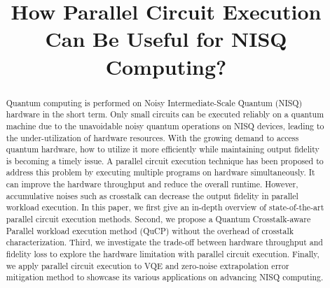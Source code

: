 \documentclass[conference]{IEEEtran}
\begin{document}
\title{How Parallel Circuit Execution Can Be Useful for NISQ Computing?\\

}

\author{
\and
{}
}

\maketitle

\begin{abstract}
Quantum computing is performed on Noisy Intermediate-Scale Quantum (NISQ) hardware in the short term. Only small circuits can be executed reliably on a quantum machine due to the unavoidable noisy quantum operations on NISQ devices, leading to the under-utilization of hardware resources. With the growing demand to access quantum hardware, how to utilize it more efficiently while maintaining output fidelity is becoming a timely issue. A parallel circuit execution technique has been proposed to address this problem by executing multiple programs on hardware simultaneously. It can improve the hardware throughput and reduce the overall runtime. However, accumulative noises such as crosstalk can decrease the output fidelity in parallel workload execution. In this paper, we first give an in-depth overview of state-of-the-art parallel circuit execution methods. Second, we propose a Quantum Crosstalk-aware Parallel workload execution method (QuCP) without the overhead of crosstalk characterization. Third, we investigate the trade-off between hardware throughput and fidelity loss to explore the hardware limitation with parallel circuit execution. Finally, we apply parallel circuit execution to VQE and zero-noise extrapolation error mitigation method to showcase its various applications on advancing NISQ computing.

\end{abstract}
\end{document}
